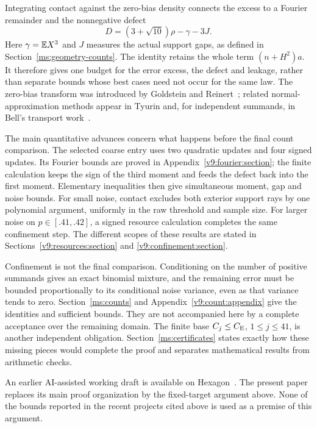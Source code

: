 Integrating contact against the zero-bias density connects the excess to a
Fourier remainder and the nonnegative defect
\[
 D=(3+\sqrt{10})\rho-\gamma-3J.
\]
Here $\gamma=\mathbb E X^3$ and $J$ measures the actual support gaps, as defined in
Section~\ref{ms:geometry-counts}. The identity retains the whole term
$(n+H^2)a$. It therefore gives one budget for the error excess, the defect
and leakage, rather than separate bounds whose best cases need not occur
for the same law. The zero-bias transform was introduced by Goldstein and
Reinert~\cite{GoldsteinReinert1997}; related normal-approximation methods
appear in Tyurin and, for independent summands, in Bell's transport
work~\cite{Tyurin2010,BellTransport2026}.

The main quantitative advances concern what happens before the final
count comparison. The selected coarse entry uses two quadratic updates
and four signed updates. Its Fourier bounds are proved in
Appendix~\ref{v9:fourier:section}; the finite calculation keeps the sign of
the third moment and feeds the defect back into the first moment.
Elementary inequalities then give simultaneous moment, gap and noise
bounds. For small noise, contact excludes both exterior support rays by
one polynomial argument, uniformly in the raw threshold and sample size.
For larger noise on $p\in[.41,.42]$, a signed resource calculation completes
the same confinement step. The different scopes of these results are
stated in Sections~\ref{v9:resources:section} and
\ref{v9:confinement:section}.

Confinement is not the final comparison. Conditioning on the number of
positive summands gives an exact binomial mixture, and the remaining
error must be bounded proportionally to its conditional noise variance,
even as that variance tends to zero. Section~\ref{ms:counts} and
Appendix~\ref{v9:count:appendix} give the identities and sufficient bounds.
They are not accompanied here by a complete acceptance over the remaining
domain. The finite base $C_j\le C_{\mathrm E}$, $1\le j\le41$, is another independent
obligation. Section~\ref{ms:certificates} states exactly how these missing
pieces would complete the proof and separates mathematical results from
arithmetic checks.

An earlier AI-assisted working draft is available on
Hexagon~\cite{rodziewiczkolodziejek2026momentdefects}. The present paper
replaces its main proof organization by the fixed-target argument above.
None of the bounds reported in the recent projects cited above is used as
a premise of this argument.
